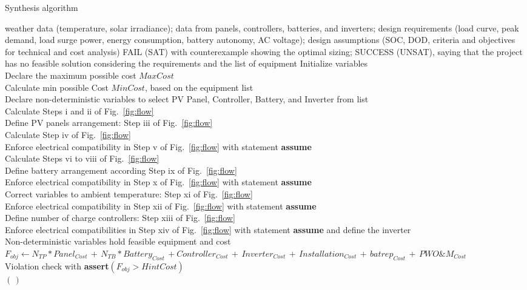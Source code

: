 \documentclass[runningheads]{llncs}
\begin{document}
 \begin{algorithm}[h]
 \caption{Synthesis algorithm}
 \begin{algorithmic}[1]
 \renewcommand{\algorithmicrequire}{\textbf{Input:}}
 \renewcommand{\algorithmicensure}{\textbf{Output:}}
 \REQUIRE weather data (temperature, solar irradiance); data from panels, controllers, batteries, and inverters; design requirements (load curve, peak demand, load surge power, energy consumption, battery autonomy, AC voltage); design assumptions (SOC, DOD, criteria and objectives for technical and cost analysis)
 \ENSURE FAIL (SAT) with counterexample showing the optimal sizing; SUCCESS (UNSAT), saying that the project has no feasible solution considering the requirements and the list of equipment
 \STATE Initialize variables \\
 \STATE Declare the maximum possible cost $MaxCost$ \\
 \STATE Calculate min possible Cost $MinCost$, based on the equipment list \\
 	\STATE Declare non-deterministic variables to select PV Panel, Controller, Battery, and Inverter from list \\
 	\STATE Calculate Steps i and ii of Fig.~\ref{fig:flow} \\
	\STATE Define PV panels arrangement: Step iii of Fig.~\ref{fig:flow} \\
	\STATE Calculate Step iv of Fig.~\ref{fig:flow} \\
	\STATE Enforce electrical compatibility in Step v of Fig.~\ref{fig:flow} with statement \textbf{assume} \\
	\STATE Calculate Steps vi to viii of Fig.~\ref{fig:flow} \\
	\STATE Define battery arrangement according Step ix of Fig.~\ref{fig:flow} \\
	\STATE Enforce electrical compatibility in Step x of Fig.~\ref{fig:flow} with statement \textbf{assume} \\
	\STATE Correct variables to ambient temperature: Step xi of Fig.~\ref{fig:flow} \\
	\STATE Enforce electrical compatibility in Step xii of Fig.~\ref{fig:flow} with statement \textbf{assume} \\
	\STATE Define number of charge controllers: Step xiii of Fig.~\ref{fig:flow}\\
	\STATE Enforce electrical compatibilities in Step xiv of Fig.~\ref{fig:flow} with statement \textbf{assume} and define the inverter \\
	\STATE Non-deterministic variables hold feasible equipment and cost \\
	\STATE $F_{obj} \leftarrow N_{TP}*Panel_{Cost} \, + \, N_{TB}*Battery_{Cost} \, + Controller_{Cost} \, + \, Inverter_{Cost} \, + \, Installation_{Cost} \, + \, batrep_{Cost} \, + \, PWO\&M_{Cost}$ \\
	\STATE Violation check with \textbf{assert}$(F_{obj} > HintCost)$ \\
 \ENDFOR
 \RETURN $(\,)$ 
 \end{algorithmic} 
 \label{alg:opt-algorithm}
 \end{algorithm}
\end{document}
